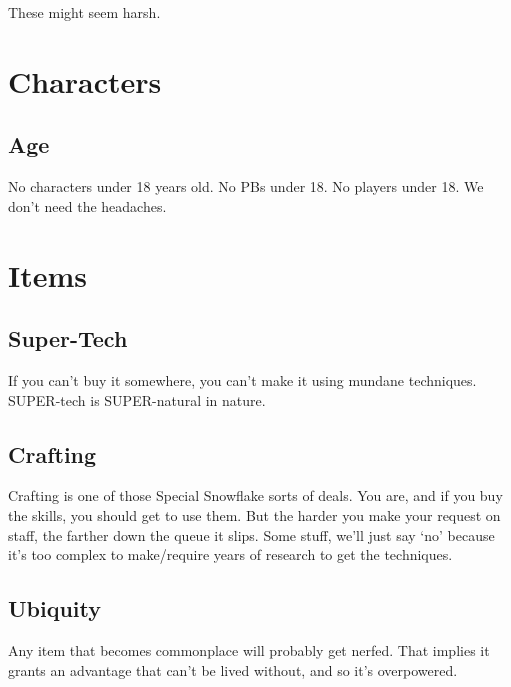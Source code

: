 These might seem harsh. 
\section{Characters}
\subsection{Age}
No characters under 18 years old. No PBs under 18. No players under
18. We don't need the headaches.
\section{Items}
\subsection{Super-Tech}
If you can't buy it somewhere, you can't make it using mundane
techniques. SUPER-tech is SUPER-natural in nature.
\subsection{Crafting}
Crafting is one of those Special Snowflake sorts of deals. You are, and if
you buy the skills, you should get to use them. But the harder you make
your request on staff, the farther down the queue it slips. Some stuff,
we'll just say `no' because it's too complex to make/require
years of research to get the techniques.
\subsection{Ubiquity}
Any item that becomes commonplace will probably get nerfed. That implies
it grants an advantage that can't  be lived without, and so it's
overpowered.
